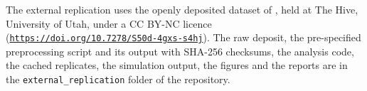 \documentclass[12pt]{article}
\providecommand{\doi}{}
\renewcommand{\doi}[1]{\href{https://doi.org/#1}{\nolinkurl{https://doi.org/#1}}}
\begin{document}
The external replication uses the openly deposited dataset of \citet{stanford2023data},
held at The Hive, University of Utah, under a CC BY-NC licence
(\doi{10.7278/S50d-4gxs-s4hj}). The raw
deposit, the pre-specified preprocessing script and its output with SHA-256 checksums,
the analysis code, the cached replicates, the simulation output, the figures and the
reports are in the \texttt{external\_replication} folder of the repository.



\end{document}
